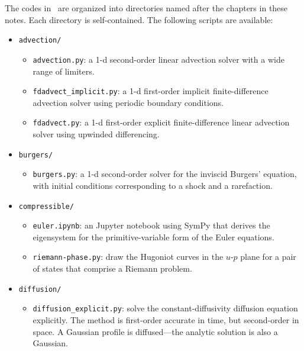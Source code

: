 The codes in \hydroex\ are organized into directories named after the
chapters in these notes.  Each directory is self-contained.  The
following scripts are available:

\begin{itemize}

\item {\tt advection/}
  
  \begin{itemize}
  \item {\tt advection.py}: a 1-d second-order linear advection solver
    with a wide range of limiters.

  \item {\tt fdadvect\_implicit.py}: a 1-d first-order implicit
    finite-difference advection solver using periodic boundary
    conditions.

  \item {\tt fdadvect.py}: a 1-d first-order explicit
    finite-difference linear advection solver using upwinded
    differencing.

  \end{itemize}

\item {\tt burgers/}

  \begin{itemize}
  \item {\tt burgers.py}: a 1-d second-order solver for the inviscid
    Burgers' equation, with initial conditions corresponding to a
    shock and a rarefaction.

  \end{itemize}

\item {\tt compressible/}

  \begin{itemize}
  \item {\tt euler.ipynb}: an {\sf Jupyter} notebook using {\sf SymPy}
      that derives the eigensystem for the primitive-variable form
      of the Euler equations.
      
  \item {\tt riemann-phase.py}: draw the Hugoniot curves in the $u$-$p$ plane
     for a pair of states that comprise a Riemann problem.
  \end{itemize}

\item {\tt diffusion/}

  \begin{itemize}
    \item {\tt diffusion\_explicit.py}: solve the constant-diffusivity
      diffusion equation explicitly.  The method is first-order
      accurate in time, but second-order in space.  A Gaussian profile
      is diffused---the analytic solution is also a Gaussian.


\end{itemize}
\end{itemize}
